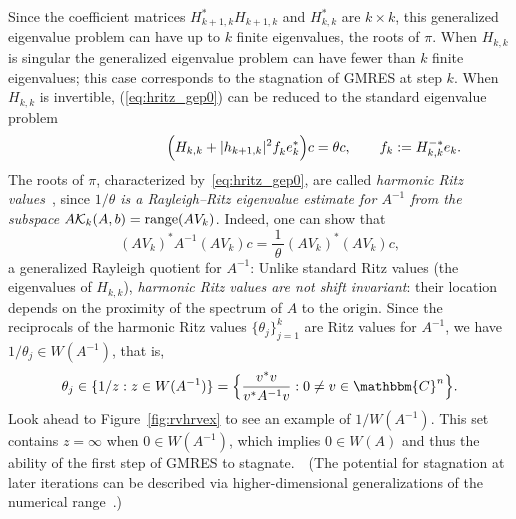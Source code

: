 \documentclass{siamart}
\def\C{\mathbbm{C}}
\def\Cn{\C^n}
\def\CK{{\cal K}}   %
\begin{document}
Since the coefficient matrices $H_{k+1,k}^*H_{k+1,k}^{}$ and $H_{k,k}^*$ are $k\times k$, this generalized eigenvalue problem can have up to $k$ finite eigenvalues, the roots of $\pi$.  When $H_{k,k}$ is singular the generalized eigenvalue problem can have fewer than $k$ finite eigenvalues; this case corresponds to the stagnation of GMRES at step $k$. 
When $H_{k,k}$ is invertible, (\ref{eq:hritz_gep0}) can be reduced to the standard eigenvalue problem
\begin{equation} \label{eq:hritz_gep}
\Big(H_{k,k} + |h_{k+1,k}|^2 f_k^{} e_k^*\Big) c = \theta c,
\rlap{\qquad $f_k := H_{k,k}^{-*} e_k$.}
\end{equation}
The roots of $\pi$, characterized by~\eqref{eq:hritz_gep0}, are called \emph{harmonic Ritz values}~\cite{Fr92,IE,IEN,PaPavdV}, since \emph{$1/\theta$ is a Rayleigh--Ritz eigenvalue estimate for $A^{-1}$ from the subspace $A\CK_k(A,b) = {\rm range}(AV_k)$}.
Indeed, one can show that
\[ (AV_k)^* A^{-1} (A V_k) c = \frac{\,1\,}{\theta} (AV_k)^*(AV_k) c,\]
 a generalized Rayleigh quotient for $A^{-1}$:
Unlike standard Ritz values (the eigenvalues of $H_{k,k}$), \emph{harmonic Ritz values are not shift invariant}: their location depends on the proximity of the spectrum of $A$ to the origin.
Since the reciprocals of the harmonic Ritz values $\{\theta_j\}_{j=1}^k$ are Ritz values for $A^{-1}$, we have $1/\theta_j \in W(A^{-1})$, that is, 
\[ \theta_j \in \{ 1/z: z \in W(A^{-1})\} 
   = \Big\{ \frac{v^*v}{v^*A^{-1} v} : 0 \ne v \in \Cn\Big\}.\]
Look ahead to Figure~\ref{fig:rvhrvex} to see an example of $1/W(A^{-1})$.
This set contains $z=\infty$ when $0 \in W(A^{-1})$, which implies $0\in W(A)$ and thus the ability of the first step of GMRES to stagnate.\ \ 
(The potential for stagnation at later iterations can be described via higher-dimensional generalizations of the numerical range~\cite[Theorem~2.7]{FJKM96}.)
\end{document}
